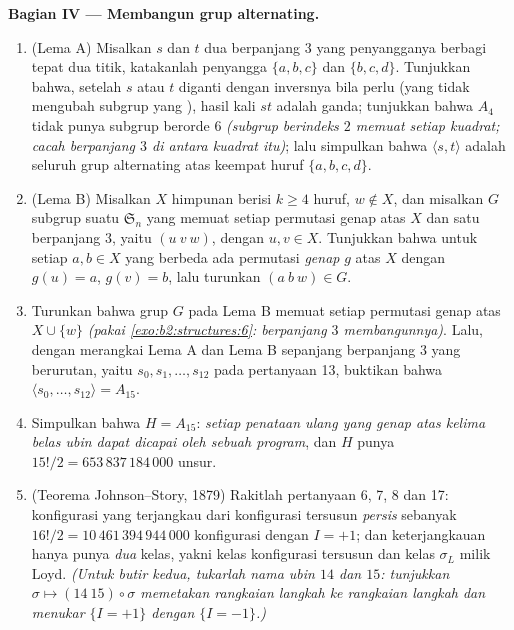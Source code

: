 \begin{problem}
\medskip
\noindent\textbf{Bagian IV --- Membangun grup alternating.}
\begin{enumerate}[resume]
  \item (Lema A) Misalkan $s$ dan $t$ dua  berpanjang $3$ yang
        penyangganya berbagi tepat dua titik, katakanlah penyangga
        $\{a, b, c\}$ dan $\{b, c, d\}$. Tunjukkan bahwa, setelah $s$
        atau $t$ diganti dengan inversnya bila perlu (yang tidak
        mengubah subgrup yang ), hasil kali $st$ adalah
         ganda; tunjukkan bahwa $A_4$ tidak punya subgrup
        berorde $6$ \emph{(subgrup berindeks $2$ memuat setiap
        kuadrat; cacah  berpanjang $3$ di antara kuadrat itu)};
        lalu simpulkan bahwa $\langle s, t\rangle$ adalah seluruh grup
        alternating atas keempat huruf $\{a, b, c, d\}$.
  \item (Lema B) Misalkan $X$ himpunan berisi $k \geq 4$ huruf, $w
        \notin X$, dan misalkan $G$ subgrup suatu
        $\mathfrak{S}_n$ yang memuat setiap permutasi genap atas $X$
        dan satu  berpanjang $3$, yaitu $(u\ v\ w)$, dengan $u, v \in X$.
        Tunjukkan bahwa untuk setiap $a, b \in X$ yang berbeda ada
        permutasi \emph{genap} $g$ atas $X$ dengan $g(u) = a$, $g(v) =
        b$, lalu turunkan $(a\ b\ w) \in G$.
  \item Turunkan bahwa grup $G$ pada Lema B memuat setiap permutasi
        genap atas $X \cup \{w\}$ \emph{(pakai
        \cref{exo:b2:structures:6}:  berpanjang $3$ membangunnya)}.
        Lalu, dengan merangkai Lema A dan Lema B sepanjang 
        berpanjang $3$ yang berurutan, yaitu $s_0, s_1, \dots, s_{12}$ pada
        pertanyaan 13,
        buktikan bahwa $\langle s_0, \dots, s_{12}\rangle = A_{15}$.
  \item Simpulkan bahwa $H = A_{15}$: \emph{setiap penataan ulang yang
        genap atas kelima belas ubin dapat dicapai oleh sebuah program},
        dan $H$ punya $15!/2 = 653\,837\,184\,000$ unsur.
  \item (Teorema Johnson--Story, 1879) Rakitlah pertanyaan 6,
        7, 8 dan 17: konfigurasi yang terjangkau dari konfigurasi
        tersusun \emph{persis} sebanyak $16!/2 =
        10\,461\,394\,944\,000$ konfigurasi dengan $I = +1$;
        dan keterjangkauan hanya punya \emph{dua} kelas, yakni kelas
        konfigurasi tersusun dan kelas $\sigma_L$ milik
        Loyd. \emph{(Untuk butir kedua, tukarlah nama ubin
        $14$ dan $15$: tunjukkan $\sigma \mapsto (14\ 15) \circ
        \sigma$ memetakan rangkaian langkah ke rangkaian langkah dan
        menukar $\{I = +1\}$ dengan $\{I = -1\}$.)}
\end{enumerate}


\end{problem}
